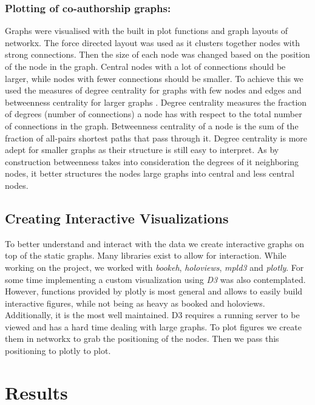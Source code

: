 \documentclass[article,twocolumn]{IEEEtran}
\begin{document}
    \hypertarget{plotting-of-co-authorship-graphs}{%
\subsubsection{Plotting of co-authorship
graphs:}\label{plotting-of-co-authorship-graphs}}

Graphs were visualised with the built in plot functions and graph
layouts of networkx. The force directed layout was used as it clusters
together nodes with strong connections. Then the size of each node was
changed based on the position of the node in the graph. Central nodes
with a lot of connections should be larger, while nodes with fewer
connections should be smaller. To achieve this we used the measures of
degree centrality for graphs with few nodes and edges and betweenness
centrality for larger graphs . Degree centrality measures the fraction
of degrees (number of connections) a node has with respect to the total
number of connections in the graph. Betweenness centrality of a node is
the sum of the fraction of all-pairs shortest paths that pass through
it. Degree centrality is more adept for smaller graphs as their
structure is still easy to interpret. As by construction betweenness
takes into consideration the degrees of it neighboring nodes, it better
structures the nodes large graphs into central and less central nodes.

    \hypertarget{creating-interactive-visualizations}{%
\subsection{Creating Interactive
Visualizations}\label{creating-interactive-visualizations}}

To better understand and interact with the data we create interactive
graphs on top of the static graphs. Many libraries exist to allow for
interaction. While working on the project, we worked with \emph{bookeh},
\emph{holoviews}, \emph{mpld3} and \emph{plotly}. For some time
implementing a custom visualization using \emph{D3} was also
contemplated. However, functions provided by plotly is most general and
allows to easily build interactive figures, while not being as heavy as
booked and holoviews. Additionally, it is the most well maintained. D3
requires a running server to be viewed and has a hard time dealing with
large graphs. To plot figures we create them in networkx to grab the
positioning of the nodes. Then we pass this positioning to plotly to
plot.

    \hypertarget{results}{%
\section{Results}\label{results}}
\end{document}
